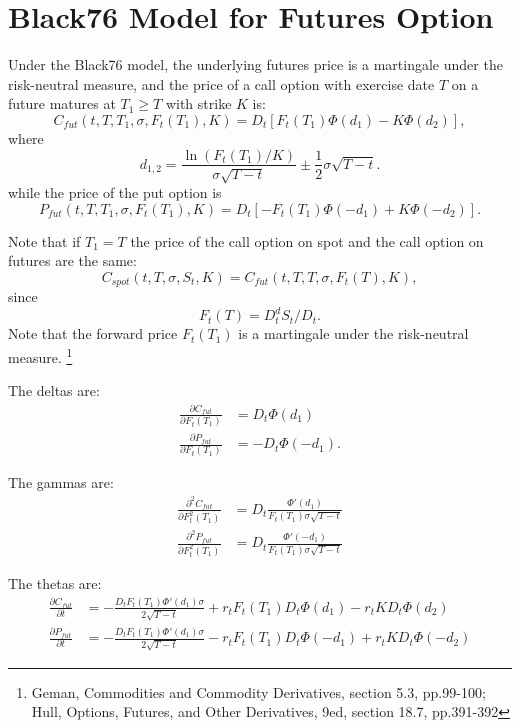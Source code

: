 \section{Black76 Model for Futures Option}
Under the Black76 model, the underlying futures price is a martingale under the
risk-neutral measure, and the price of a call option with exercise date $T$ on a
future matures at $T_1\ge T$ with strike $K$ is:
\begin{equation}
	C_{fut}(t,T,T_1,\sigma,F_t(T_1),K) 
	  = D_t [F_t(T_1) \Phi(d_1) - K \Phi(d_2)],
\end{equation}
where
\[
	d_{1,2}= \frac{\ln(F_t(T_1)/K)}{\sigma\sqrt{T-t} }
		         \pm \frac{1}{2}\sigma\sqrt{T-t}.
\]
while the price of the put option is
\begin{equation}
	P_{fut}(t,T,T_1,\sigma,F_t(T_1),K) 
	  = D_t [-F_t(T_1) \Phi(-d_1) + K \Phi(-d_2)].
\end{equation}

Note that if $T_1=T$ the price of the call option on spot and the call option on
futures are the same:
\[
	C_{spot}(t,T,\sigma,S_t,K) = C_{fut}(t,T,T,\sigma,F_t(T),K),
\]
since
\[
	F_t(T) = D_t^d S_t / D_t.
\]
Note that the forward price $F_t(T_1)$ is a martingale under the risk-neutral
measure.
\footnote{Geman, Commodities and Commodity Derivatives, section 5.3, pp.99-100;
Hull, Options, Futures, and Other Derivatives, 9ed, section 18.7, pp.391-392}

The deltas are: 
\begin{align}
	\frac{\partial C_{fut}}{\partial F_t(T_1)} &= D_t \Phi(d_1)   \\
	\frac{\partial P_{fut}}{\partial F_t(T_1)} &= - D_t \Phi(-d_1).
\end{align}

The gammas are: 
\begin{align}
	\frac{\partial^2 C_{fut}}{\partial F_t^2(T_1)} 
  	&= D_t \frac{\Phi'(d_1)}{F_t(T_1)\sigma \sqrt{T-t}}  \\
	\frac{\partial^2 P_{fut}}{\partial F_t^2(T_1)} 
	  &= D_t \frac{\Phi'(-d_1)}{F_t(T_1)\sigma \sqrt{T-t}}
\end{align}

The thetas are:
\begin{align}
  \frac{\partial C_{fut}}{\partial t} 
	  &= - \frac{D_t F_t(T_1) \Phi'(d_1)\sigma}{2\sqrt{T-t}}
	     + r_t F_t(T_1) D_t \Phi(d_1) - r_t K D_t \Phi(d_2)   \\
  \frac{\partial P_{fut}}{\partial t} 
	  &= - \frac{D_t F_t(T_1) \Phi'(d_1)\sigma}{2\sqrt{T-t}}
	     - r_t F_t(T_1) D_t \Phi(-d_1) + r_t K D_t \Phi(-d_2)
\end{align}


